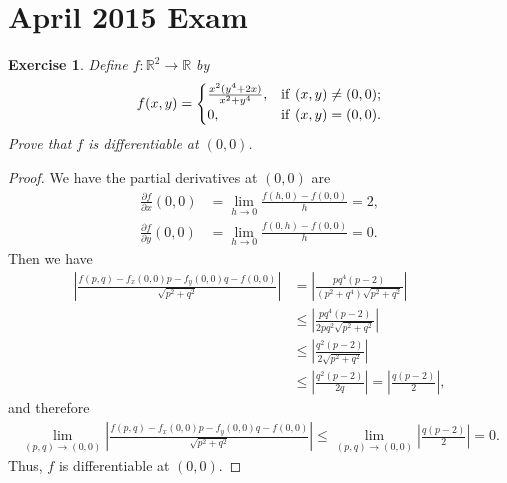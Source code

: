 \documentclass[11pt]{article}
\newtheorem{exercise}{Exercise}[section]
\theoremstyle{definition}
\numberwithin{equation}{subsection}
\begin{document}
\newpage
\section{April 2015 Exam}

\begin{exercise}
Define $f: \mathbb{R}^2 \to \mathbb{R}$ by
\begin{align*}
    f(x,y) = \begin{cases}
          \frac{x^2 (y^4 + 2x)}{x^2 + y^4}, & {\rm if}\,\, (x,y) \neq (0,0); \\
        0, & {\rm if}\,\, (x,y) = (0,0).
    \end{cases}
\end{align*}
Prove that $f$ is differentiable at $(0,0)$.
\end{exercise}
\begin{proof}
We have the partial derivatives at $(0,0)$ are
\begin{align*}
    \frac{\partial f}{\partial x}(0,0) & = \lim_{h\to 0} \frac{f(h,0) - f(0,0)}{h} = 2, \\
    \frac{\partial f}{\partial y}(0,0) & = \lim_{h\to 0} \frac{f(0,h) - f(0,0)}{h} = 0.
\end{align*}
Then we have
\begin{align*}
    \left| \frac{f(p,q) - f_x(0,0)p - f_y(0,0)q - f(0,0)}{\sqrt{p^2 + q^2}} \right| & = \left| \frac{pq^4 (p - 2)}{(p^2 + q^4) \sqrt{p^2 + q^2}} \right| \\
    & \leq \left| \frac{pq^4 (p - 2)}{ 2pq^2 \sqrt{p^2 + q^2}} \right| \\
    & \leq \left| \frac{q^2 (p - 2)}{ 2\sqrt{p^2 + q^2}} \right| \\
    & \leq \left| \frac{q^2 (p - 2)}{2q} \right| = \left| \frac{q(p - 2)}{2} \right|,
\end{align*}
and therefore
\begin{align*}
    \lim_{(p,q) \to (0,0)} \left| \frac{f(p,q) - f_x(0,0)p - f_y(0,0)q - f(0,0)}{\sqrt{p^2 + q^2}} \right| \leq \lim_{(p,q) \to (0,0)} \left| \frac{q(p - 2)}{2} \right| = 0.
\end{align*}
Thus, $f$ is differentiable at $(0,0)$.
\end{proof}

\medskip
\end{document}
